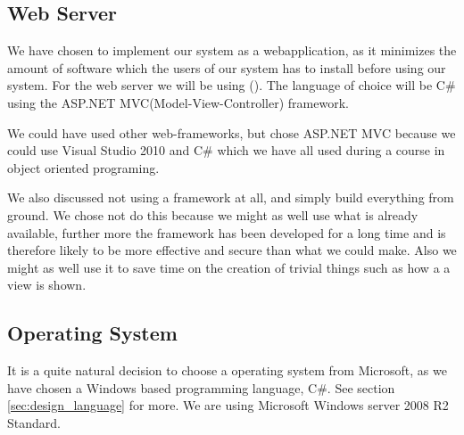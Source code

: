 \subsection{Web Server}
\label{subsec:webserver}


We have chosen to implement our system as a webapplication, as it minimizes the amount of software which the users of our system has to install before using our system. 
For the web server we will be using  \wholeiis[] (\iis[]). 
The language of choice will be C\# using the ASP.NET MVC(Model-View-Controller) framework.

We could have used other web-frameworks, but chose ASP.NET MVC because we could use Visual Studio 2010 and C\# which we have all used during a course in object oriented programing.

We also discussed not using a framework at all, and simply build everything from ground.
We chose not do this because we might as well use what is already available, further more the framework has been developed for a long time and is therefore likely to be more effective and secure than what we could make.
Also we might as well use it to save time on the creation of trivial things such as how a a view is shown.

\subsection{Operating System}
\label{subsec:operating_system}
It is a quite natural decision to choose a operating system from Microsoft, as we have chosen a Windows based programming language, C\#. See section \ref{sec:design_language} for more.
We are using Microsoft Windows server 2008 R2 Standard. 